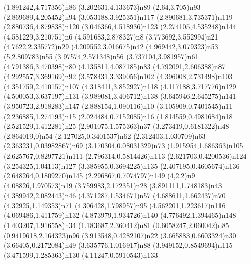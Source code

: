 \dotnode[](1.891242,4.717356){n86}
\dotnode[](3.202631,4.133673){n89}
\dotnode[](2.64,3.705){n93}
\dotnode[](2.869689,4.205452){n94}
\dotnode[](3.053188,3.925351){n117}
\dotnode[](2.890681,3.735371){n119}
\dotnode[fillcolor=gray](2.880736,4.879838){n120}
\dotnode[](3.046366,4.518936){n123}
\dotnode[](2.274105,4.535248){n144}
\dotnode[fillcolor=gray](4.581229,3.210751){n6}
\dotnode[](4.591683,2.878327){n8}
\dotnode[](3.773692,3.552994){n21}
\dotnode[](4.7622,2.335772){n29}
\dotnode[](4.209552,3.016675){n42}
\dotnode[](4.969442,3.079323){n53}
\dotnode[](5,2.809783){n55}
\dotnode[](3.97574,2.571348){n56}
\dotnode[](3.737104,3.981957){n61}
\dotnode[](4.791386,3.470398){n80}
\dotnode[](4.135811,4.087185){n83}
\dotnode[](4.792091,2.606388){n87}
\dotnode[](4.292557,3.369169){n92}
\dotnode[](3.578431,3.339056){n102}
\dotnode[](4.396008,2.731498){n103}
\dotnode[](4.351759,2.410157){n107}
\dotnode[](4.318411,3.852927){n118}
\dotnode[](4.117188,3.717776){n129}
\dotnode[](4.500053,3.637197){n131}
\dotnode[](3.989081,3.406712){n138}
\dotnode[](3.645946,2.645275){n141}
\dotnode[](3.950723,2.918283){n147}
\dotnode[](2.888154,1.090116){n10}
\dotnode[](3.105909,0.7401545){n11}
\dotnode[](2.236885,1.274193){n15}
\dotnode[](2.024484,0.7152085){n16}
\dotnode[](1.814559,0.4981684){n18}
\dotnode[](2.521529,1.412281){n25}
\dotnode[](2.901075,1.575363){n37}
\dotnode[](3.273419,0.6181322){n48}
\dotnode[](2.864019,0){n54}
\dotnode[](2.127025,0.3401537){n62}
\dotnode[](2.312403,1.030709){n63}
\dotnode[](2.363231,0.03982867){n69}
\dotnode[](3.170304,0.08031329){n73}
\dotnode[](1.915954,1.686363){n105}
\dotnode[](2.625767,0.8297721){n111}
\dotnode[fillcolor=gray](2.796314,0.5814426){n113}
\dotnode[](2.621703,0.4200536){n124}
\dotnode[](3.254325,1.04113){n127}
\dotnode[](3.385955,0.3694225){n135}
\dotnode[](2.407195,0.4605674){n136}
\dotnode[](2.648264,0.1809270){n145}
\dotnode[](2.296867,0.7074797){n149}
\dotnode[](4,2.2){n9}
\dotnode[](4.08826,1.970573){n19}
\dotnode[](3.759983,2.172351){n28}
\dotnode[](3.891111,1.748183){n43}
\dotnode[](4.389942,2.082443){n46}
\dotnode[fillcolor=gray](4.371287,1.534671){n57}
\dotnode[](4.688611,1.662437){n70}
\dotnode[](4.32925,1.149353){n71}
\dotnode[](4.306428,1.798957){n95}
\dotnode[](4.562201,1.223617){n116}
\dotnode[](4.069486,1.411759){n132}
\dotnode[](4.873979,1.934726){n140}
\dotnode[](4.776492,1.394465){n148}
\dotnode[](1.403207,1.916558){n34}
\dotnode[fillcolor=gray](1.183687,2.360412){n81}
\dotnode[](0.6058247,2.060042){n85}
\dotnode[](0.9419618,2.164323){n96}
\dotnode[](3.913548,0.4282107){n22}
\dotnode[](3.665883,0.6603324){n30}
\dotnode[fillcolor=gray](3.66405,0.2172084){n49}
\dotnode[](3.635776,1.016917){n88}
\dotnode[](3.949152,0.8549694){n115}
\dotnode[](3.471599,1.285363){n130}
\dotnode[](4.11247,0.5910543){n133}
